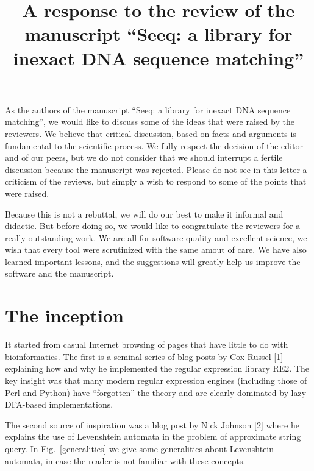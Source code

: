 \documentclass[12pt]{article}
\title{A response to the review of the manuscript
``Seeq: a library for inexact DNA sequence matching''}
\date{}
\begin{document}
\maketitle
As the authors of the manuscript ``Seeq: a library for inexact
DNA sequence matching'', we would like to discuss some of the
ideas that were raised by the reviewers. We believe that
critical discussion, based on facts and arguments is fundamental
to the scientific process. We fully respect the decision of the
editor and of our peers, but we do not consider that we should
interrupt a fertile discussion because the manuscript was
rejected. Please do not see in this letter a criticism of the
reviews, but simply a wish to respond to some of the points that
were raised.

Because this is not a rebuttal, we will do our best to make it
informal and didactic.
But before doing so, we would like to congratulate the reviewers for
a really outstanding work. We are all for software quality and
excellent science, we wish that every tool were scrutinized with
the same amout of care. We have also learned important lessons,
and the suggestions will greatly help us improve the software and
the manuscript.

\section{The inception}

It started from casual Internet
browsing of pages that have little to do with bioinformatics.
The first is a seminal series of blog posts by Cox Russel [1]
explaining how and why he implemented the regular expression library
RE2. The key insight was that many modern regular expression engines
(including those of Perl and Python) have ``forgotten'' the
theory and are clearly dominated by lazy DFA-based implementations.

The second source of inspiration was a blog post by Nick Johnson [2]
where he explains the use of Levenshtein automata in the problem of
approximate string query. In Fig.~\ref{generalities} we give some
generalities about Levenshtein automata, in case the reader is not
familiar with these concepts.
\end{document}
